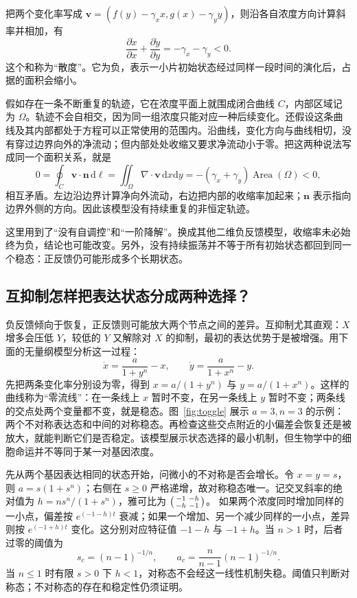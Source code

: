 \documentclass[11pt,a4paper,UTF8,fontset=fandol]{ctexart}
\newcommand{\dd}{\mathrm d}\newcommand{\R}{\mathbb R}\newcommand{\ssv}{\mathrm{ss}}
\begin{document}
把两个变化率写成 $\bm v=(f(y)-\gamma_xx,g(x)-\gamma_yy)$，则沿各自浓度方向计算斜率并相加，有
\[
\frac{\partial\dot x}{\partial x}+\frac{\partial\dot y}{\partial y}=-\gamma_x-\gamma_y<0.
\]
这个和称为“散度”。它为负，表示一小片初始状态经过同样一段时间的演化后，占据的面积会缩小。

假如存在一条不断重复的轨迹，它在浓度平面上就围成闭合曲线 $C$，内部区域记为 $\Omega$。轨迹不会自相交，因为同一组浓度只能对应一种后续变化。还假设这条曲线及其内部都处于方程可以正常使用的范围内。沿曲线，变化方向与曲线相切，没有穿过边界向外的净流动；但内部处处收缩又要求净流动小于零。把这两种说法写成同一个面积关系，就是
\[
0=\oint_C\bm v\cdot\bm n\,\dd\ell
=\iint_\Omega\nabla\cdot\bm v\,\dd x\dd y
=-(\gamma_x+\gamma_y)\operatorname{Area}(\Omega)<0,
\]
相互矛盾。左边沿边界计算净向外流动，右边把内部的收缩率加起来；$\bm n$ 表示指向边界外侧的方向。因此该模型没有持续重复的非恒定轨迹。

这里用到了“没有自调控”和“一阶降解”。换成其他二维负反馈模型，收缩率未必始终为负，结论也可能改变。另外，没有持续振荡并不等于所有初始状态都回到同一个稳态：正反馈仍可能形成多个长期状态。

\subsection{互抑制怎样把表达状态分成两种选择？}
负反馈倾向于恢复，正反馈则可能放大两个节点之间的差异。互抑制尤其直观：$X$ 增多会压低 $Y$，较低的 $Y$ 又解除对 $X$ 的抑制，最初的表达优势于是被增强。用下面的无量纲模型分析这一过程：
\begin{equation}\dot x=\frac{a}{1+y^n}-x,\qquad\dot y=\frac{a}{1+x^n}-y.\label{eq:toggle}\end{equation}
先把两条变化率分别设为零，得到 $x=a/(1+y^n)$ 与 $y=a/(1+x^n)$。这样的曲线称为“零流线”：在一条线上 $x$ 暂时不变，在另一条线上 $y$ 暂时不变；两条线的交点处两个变量都不变，就是稳态。图~\ref{fig:toggle} 展示 $a=3,n=3$ 的示例：两个不对称表达态和中间的对称稳态。再检查这些交点附近的小偏差会恢复还是被放大，就能判断它们是否稳定。该模型展示状态选择的最小机制，但生物学中的细胞命运并不等同于某一对基因浓度。

先从两个基因表达相同的状态开始，问微小的不对称是否会增长。令 $x=y=s$，则 $a=s(1+s^n)$；右侧在 $s\geq0$ 严格递增，故对称稳态唯一。记交叉斜率的绝对值为
$h=ns^n/(1+s^n)$，雅可比为 $\begin{psmallmatrix}-1&-h\\-h&-1\end{psmallmatrix}$。
如果两个浓度同时增加同样的一小点，偏差按 $e^{(-1-h)t}$ 衰减；如果一个增加、另一个减少同样的一小点，差异则按 $e^{(-1+h)t}$ 变化。这分别对应特征值 $-1-h$ 与 $-1+h$。当 $n>1$ 时，后者过零的阈值为
\[
s_c=(n-1)^{-1/n},\qquad a_c=\frac n{n-1}(n-1)^{-1/n}.
\]
当 $n\leq1$ 时有限 $s>0$ 下 $h<1$，对称态不会经这一线性机制失稳。阈值只判断对称态；不对称态的存在和稳定性仍须证明。
\end{document}
